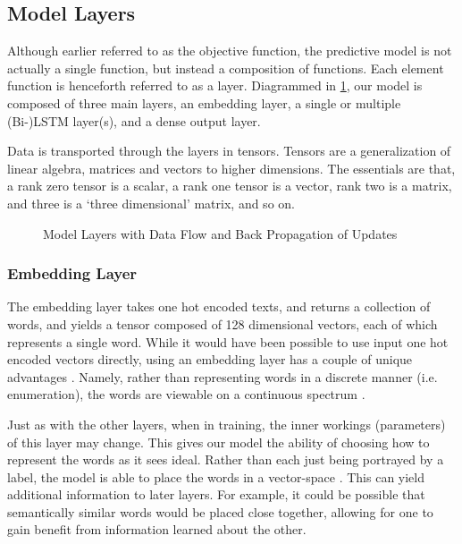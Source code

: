 \documentclass[titlepage,letterpaper]{article}
\begin{document}
\subsection{Model Layers}

Although earlier referred to as the objective function, the predictive model is not actually a single function, but instead a composition of functions. Each element function is henceforth referred to as a layer. Diagrammed in \cref{layers}, our model is composed of three main layers, an embedding layer, a single or multiple (Bi-)LSTM layer(s), and a dense output layer.

Data is transported through the layers in tensors\cite{tensorflow}. Tensors are a generalization of linear algebra, matrices and vectors to higher dimensions. The essentials are that, a rank zero tensor is a scalar, a rank one tensor is a vector, rank two is a matrix, and three is a `three dimensional' matrix, and so on. \cite{tensors}

\begin{figure}[h]
	\centering
	\caption{Model Layers with Data Flow and Back Propagation of Updates \cite{knisely}}
	\label{layers}
	\def\svgwidth{3.5in}
	
\end{figure}




\subsubsection{Embedding Layer}

The embedding layer takes one hot encoded texts, and returns a collection of words, and yields a tensor composed of 128 dimensional vectors, each of which represents a single word. While it would have been possible to use input one hot encoded vectors directly, using an embedding layer has a couple of unique advantages \cite{Keras.io}. Namely, rather than representing words in a discrete manner (i.e. enumeration), the words are viewable on a continuous spectrum \cite{dropout_embedding}.  

Just as with the other layers, when in training, the inner workings (parameters) of this layer may change. This gives our model the ability of choosing how to represent the words as it sees ideal. Rather than each just being portrayed by a label, the model is able to place the words in a vector-space \cite{embed}. This can yield additional information to later layers. For example, it could be possible that semantically similar words would be placed close together, allowing for one to gain benefit from information learned about the other.\cite{dropout_embedding,embed}
\end{document}
